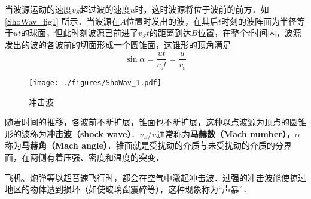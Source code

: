 
当波源运动的速度$v_S$超过波的速度$u $时，这时波源将位于波前的前方．如\autoref{ShoWav_fig1} 所示．当波源在$A $位置时发出的波，在其后$t $时刻的波阵面为半径等于$ut $的球面，但此时刻波源已前进了$v_St$的距离到达$B $位置，在整个$t $时间内，波源发出的波的各波前的切面形成一个圆锥面，这锥形的顶角满足
\begin{equation}
\sin \alpha=\frac{u t}{v_{\mathrm{s}} t}=\frac{u}{v_{\mathrm{s}}}
\end{equation}
\begin{figure}[ht]
\centering
\texttt{[image: ./figures/ShoWav\_1.pdf]}
\caption{冲击波} \label{ShoWav_fig1}
\end{figure}
随着时间的推移，各波前不断扩展，锥面也不断扩展，这种以点波源为顶点的圆锥形的波称为\textbf{冲击波（shock wave）}．$v_S/u$通常称为\textbf{马赫数（Mach number）}，$\alpha$称为\textbf{马赫角（Mach angle）}．锥面就是受扰动的介质与未受扰动的介质的分界面，在两侧有着压强、密度和温度的突变．

飞机、炮弹等以超音速飞行时，都会在空气中激起冲击波．过强的冲击波能使掠过地区的物体遭到损坏（如使玻璃窗震碎等），这种现象称为“声暴”．
